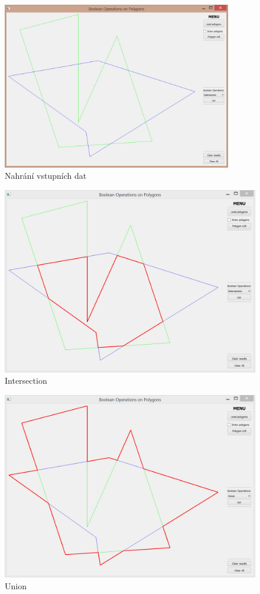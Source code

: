 \documentclass[a4paper, 12pt]{article}
\begin{document}
\begin{figure}[h]
	\centering
	\includegraphics[width=10cm]{vstup.jpg}
	\caption{Nahrání vstupních dat}
\end{figure}

\begin{figure}[h]
	\centering
	\includegraphics[width=12cm]{inter.jpg}
	\caption{Intersection}
\end{figure}

\begin{figure}[h]
	\centering
	\includegraphics[width=12cm]{union.jpg}
	\caption{Union}
\end{figure}
\end{document}
